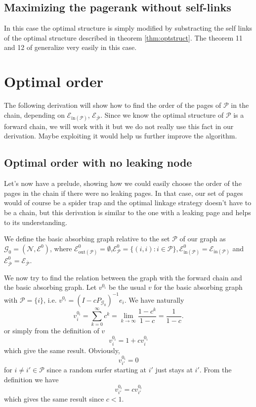 \documentclass{article}
\newcommand{\1}{\mathbf{1}}
\theoremstyle{definition}
\begin{document}
\subsection{Maximizing the pagerank without self-links}
In this case the optimal structure is simply modified by substracting the self links of the optimal structure described in theorem \ref{thm:optstruct}. The theorem 11 and 12 of \cite{de2008maximizing} generalize very easily in this case.


\section{Optimal order}
The following derivation will show how to find the order of the pages of $\mathcal{P}$ in the chain, depending
on $\mathcal{E}_{\text{in}(\mathcal{P})}$, $\mathcal{E}_{\overline{\mathcal{P}}}$.
Since we know the optimal structure of $\mathcal{P}$ is a forward chain, we will work with it but
we do not really use this fact in our derivation.
Maybe exploiting it would help us further improve the algorithm.

\subsection{Optimal order with no leaking node}
\label{sec:no_leak}
Let's now have a prelude, showing how we could easily choose the order of the pages in the chain if there were
no leaking pages.
In that case, our set of pages would of course be a spider trap and the optimal linkage strategy doesn't have to be a chain, but this derivation is similar
to the one with a leaking page and helps to its understanding.

We define the basic absorbing graph relative to the set \(\mathcal{P}\) of our graph as \(\mathcal{G}_0=(\mathcal{N},\mathcal{E}^0)\), where \(\mathcal{E}_{\text{out}(\mathcal{P})}^0 = \emptyset\),\(\mathcal{E}^0_{\mathcal{P}}=\{(i,i):i\in \mathcal{P}\},\mathcal{E}_{\text{in}(\mathcal{P})}^0 = \mathcal{E}_{\text{in}(\mathcal{P})}\) and \( \mathcal{E}^0_{\overline{\mathcal{P}}}=\mathcal{E}_{\overline{\mathcal{P}}}\).

We now try to find the relation between the graph with the forward chain and the basic absorbing graph.
Let \(v^{0_i}\) be the usual \(v\) for the basic absorbing graph with $\mathcal{P} = \{i\}$,
i.e. \(v^{0_i} = (I - cP_{\mathcal{G}_0})^{-1}e_i\).
We have naturally
\[ v_i^{0_i} = \sum_{k=0}^\infty c^k = \lim_{k \to \infty} \frac{1-c^k}{1-c} = \frac{1}{1-c}. \]
or simply from the definition of $v$
\[ v_i^{0_i} = 1 + c v_i^{0_i} \]
which give the same result.
Obviously,
\[ v_{i'}^{0_i} = 0 \]
for $i \neq i' \in \mathcal{P}$ since a random surfer starting at $i'$ just stays at $i'$.
From the definition we have
\[ v_{i'}^{0_i} = c v_{i'}^{0_i} \]
which gives the same result since \(c < 1\).
\end{document}
